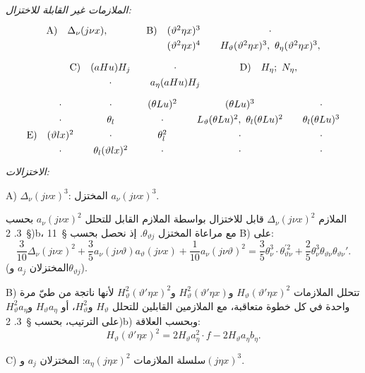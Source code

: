 \documentclass[11pt]{article}
\providecommand{\A}{\Delta}
\begin{document}
\noindent\emph{الملازمات غير القابلة للاختزال:}
\[
\renewcommand{\arraystretch}{1.28}
\begin{array}{@{}r@{\quad}c@{\qquad\qquad}r@{\quad}c@{\qquad}c@{}}
\text{A)}&\A_\nu(j\nu x),&\text{B)}&(\vartheta^2\eta x)^3&\cdot\\
&&&(\vartheta^2\eta x)^4&H_\vartheta(\vartheta^2\eta x)^3,\ \theta_\eta(\vartheta^2\eta x)^3,
\end{array}
\]
\[
\renewcommand{\arraystretch}{1.28}
\begin{array}{@{}r@{\quad}c@{\qquad}c@{\qquad\qquad}r@{\quad}c@{}}
\text{C)}&(aHu)H_j&\cdot&\text{D)}&H_\eta;\ N_\eta,\\
&\cdot&a_\eta(aHu)H_j&&
\end{array}
\]
\[
\renewcommand{\arraystretch}{1.30}
\begin{array}{@{}r@{\quad}c@{\qquad}c@{\qquad}c@{\qquad}c@{\qquad}c@{}}
&\cdot&\cdot&(\theta Lu)^2&(\theta Lu)^3&\cdot\\
&\cdot&\theta_l&\cdot&L_\vartheta(\theta Lu)^2,\ \theta_l(\theta Lu)^2&\theta_l(\theta Lu)^3\\
\text{E)}&(\vartheta lx)^2&\cdot&\theta_l^2&\cdot&\cdot\\
&\cdot&\theta_l(\vartheta lx)^2&\cdot&\cdot&\cdot
\end{array}
\]
\noindent\emph{الاختزالات:}

\noindent A) $\A_\nu(j\nu x)^3$: المختزل $a_\nu(j\nu x)^3$.

الملازم $\A_\nu(j\nu x)^2$ قابل للاختزال بواسطة الملازم القابل للتحلل $a_\nu(j\nu x)^2$ بحسب \S\ 3. 2)b، مع مراعاة المختزل $\theta_{\vartheta j}$. إذ نحصل بحسب \S\ 11 B) على:
\[
\frac3{10}\A_\nu(j\nu x)^2+\frac35a_\nu(j\nu\vartheta)a_\vartheta(j\nu x)
+\frac1{10}a_\nu(j\nu\vartheta)^2
=\frac35\theta_\nu^3\cdot\theta_{\vartheta\nu}^{\prime2}+\frac25\theta_\nu^3\theta_{\vartheta\nu}\theta_{\vartheta\nu}'.
\]
(المختزلان $a_j$ و$\theta_{\vartheta j}$).

\noindent B) تتحلل الملازمات $H_\vartheta(\vartheta'\eta x)^2$ و$H_\vartheta^2(\vartheta'\eta x)$ و$H_\vartheta^2(\vartheta'\eta x)^2$ لأنها ناتجة من طيّ مرة واحدة في كل خطوة متعاقبة، مع الملازمين القابلين للتحلل $H_\vartheta$ و$H_\vartheta^2$، أو $H_\vartheta a_\eta$ و$H_\vartheta^2a_\eta$ على الترتيب، بحسب \S\ 3. 2)b) وبحسب العلاقة:
\[
H_\vartheta(\vartheta'\eta x)^2=2H_\vartheta a_\eta^2\cdot f-2H_\vartheta a_\eta b_\eta.
\]

\noindent C) سلسلة الملازمات $a_\eta(j\eta x)^2$: المختزلان $a_j$ و$(j\eta x)^3$.
\end{document}
